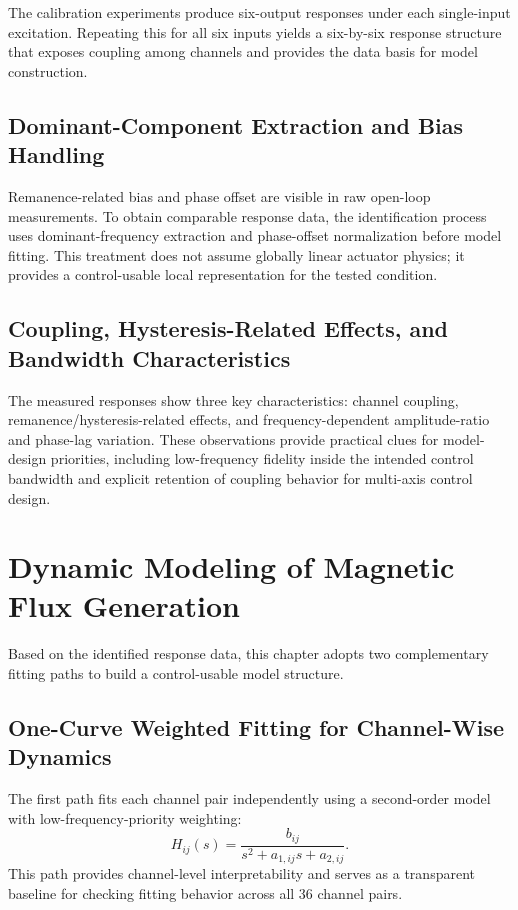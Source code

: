 The calibration experiments produce six-output responses under each single-input excitation. Repeating this for all six inputs yields a six-by-six response structure that exposes coupling among channels and provides the data basis for model construction.

\subsection{Dominant-Component Extraction and Bias Handling}

Remanence-related bias and phase offset are visible in raw open-loop measurements. To obtain comparable response data, the identification process uses dominant-frequency extraction and phase-offset normalization before model fitting. This treatment does not assume globally linear actuator physics; it provides a control-usable local representation for the tested condition.

\subsection{Coupling, Hysteresis-Related Effects, and Bandwidth Characteristics}

The measured responses show three key characteristics: channel coupling, remanence/hysteresis-related effects, and frequency-dependent amplitude-ratio and phase-lag variation. These observations provide practical clues for model-design priorities, including low-frequency fidelity inside the intended control bandwidth and explicit retention of coupling behavior for multi-axis control design.

\section{Dynamic Modeling of Magnetic Flux Generation}

Based on the identified response data, this chapter adopts two complementary fitting paths to build a control-usable model structure.

\subsection{One-Curve Weighted Fitting for Channel-Wise Dynamics}

The first path fits each channel pair independently using a second-order model with low-frequency-priority weighting:
\begin{equation}
H_{ij}(s) = \frac{b_{ij}}{s^{2} + a_{1,ij}s + a_{2,ij}} .
\end{equation}
This path provides channel-level interpretability and serves as a transparent baseline for checking fitting behavior across all 36 channel pairs.

